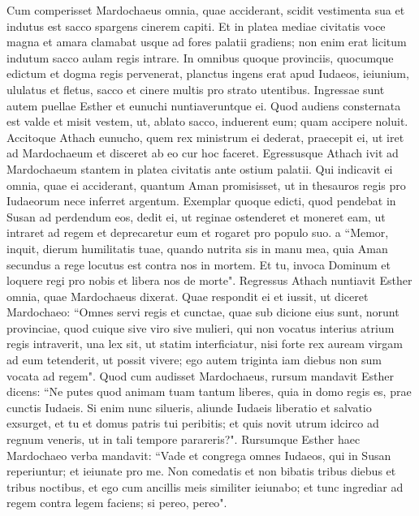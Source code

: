 \begin{biblechapter} 
\verse Cum comperisset Mardochaeus omnia, quae acciderant, scidit vestimenta sua et indutus est sacco spargens cinerem capiti. Et in platea mediae civitatis voce magna et amara clamabat 
\verse usque ad fores palatii gradiens; non enim erat licitum indutum sacco aulam regis intrare. 
\verse In omnibus quoque provinciis, quocumque edictum et dogma regis pervenerat, planctus ingens erat apud Iudaeos, ieiunium, ululatus et fletus, sacco et cinere multis pro strato utentibus. 
\verse Ingressae sunt autem puellae Esther et eunuchi nuntiaveruntque ei. Quod audiens consternata est valde et misit vestem, ut, ablato sacco, induerent eum; quam accipere noluit. 
\verse Accitoque Athach eunucho, quem rex ministrum ei dederat, praecepit ei, ut iret ad Mardochaeum et disceret ab eo cur hoc faceret.  
\verse Egressusque Athach ivit ad Mardochaeum stantem in platea civitatis ante ostium palatii. 
\verse Qui indicavit ei omnia, quae ei acciderant, quantum Aman promisisset, ut in thesauros regis pro Iudaeorum nece inferret argentum. 
\verse Exemplar quoque edicti, quod pendebat in Susan ad perdendum eos, dedit ei, ut reginae ostenderet et moneret eam, ut intraret ad regem et deprecaretur eum et rogaret pro populo suo. 
\verse a “Memor, inquit, dierum humilitatis tuae, quando nutrita sis in manu mea, quia Aman secundus a rege locutus est contra nos in mortem. Et tu, invoca Dominum et loquere regi pro nobis et libera nos de morte". 
\verse Regressus Athach nuntiavit Esther omnia, quae Mardochaeus dixerat.  
\verse Quae respondit ei et iussit, ut diceret Mardochaeo: 
\verse “Omnes servi regis et cunctae, quae sub dicione eius sunt, norunt provinciae, quod cuique sive viro sive mulieri, qui non vocatus interius atrium regis intraverit, una lex sit, ut statim interficiatur, nisi forte rex auream virgam ad eum tetenderit, ut possit vivere; ego autem triginta iam diebus non sum vocata ad regem". 
\verse Quod cum audisset Mardochaeus, 
\verse rursum mandavit Esther dicens: “Ne putes quod animam tuam tantum liberes, quia in domo regis es, prae cunctis Iudaeis. 
\verse Si enim nunc silueris, aliunde Iudaeis liberatio et salvatio exsurget, et tu et domus patris tui peribitis; et quis novit utrum idcirco ad regnum veneris, ut in tali tempore parareris?". 
\verse Rursumque Esther haec Mardochaeo verba mandavit: 
\verse “Vade et congrega omnes Iudaeos, qui in Susan reperiuntur; et ieiunate pro me. Non comedatis et non bibatis tribus diebus et tribus noctibus, et ego cum ancillis meis similiter ieiunabo; et tunc ingrediar ad regem contra legem faciens; si pereo, pereo". 

\end{biblechapter}
